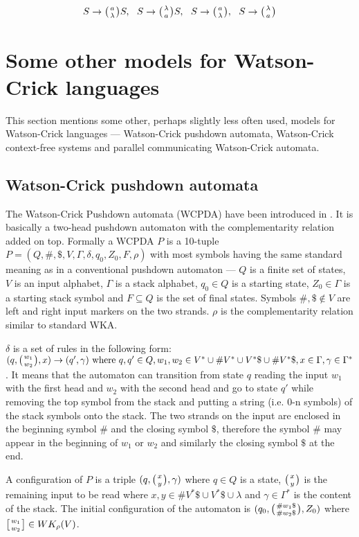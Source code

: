 $$S \rightarrow \wkpair{a}{\lambda} S, \:\:\: S \rightarrow \wkpair{\lambda}{a} S, \:\:\: S \rightarrow \wkpair{a}{\lambda}, \:\:\: S \rightarrow \wkpair{\lambda}{a}$$

\section{Some other models for Watson-Crick languages}
This section mentions some other, perhaps slightly less often used, models for Watson-Crick languages --- Watson-Crick pushdown automata, Watson-Crick context-free systems and parallel communicating Watson-Crick automata.

\subsection{Watson-Crick pushdown automata}
The Watson-Crick Pushdown automata (WCPDA) have been introduced in \cite{WK_PUSHDOWN_AUT}. It is basically a two-head pushdown automaton with the complementarity relation added on top. Formally a WCPDA $P$ is a 10-tuple $P = (Q, \#, \$, V, \Gamma, \delta, q_0, Z_0, F, \rho)$ with most symbols having the same standard meaning as in a conventional pushdown automaton --- $Q$ is a finite set of states, $V$ is an input alphabet, $\Gamma$ is a stack alphabet, $q_0 \in Q$ is a starting state, $Z_0 \in \Gamma$ is a starting stack symbol and $F \subseteq Q$ is the set of final states. Symbols $\#, \$ \notin V$ are left and right input markers on the two strands. $\rho$ is the complementarity relation similar to standard WKA.

$\delta$ is a set of rules in the following form: $(q, \wkpair{w_1}{w_2}, x) \rightarrow (q', \gamma) \textnormal{ where } q, q' \in Q, w_1, w_2 \in V^* \cup \#V^* \cup V^*\$ \cup \#V^*\$, x \in \Gamma, \gamma \in \Gamma^*$. It means that the automaton can transition from state $q$ reading the input $w_1$ with the first head and $w_2$ with the second head and go to state $q'$ while removing the top symbol from the stack and putting a string (i.e. 0-n symbols) of the stack symbols onto the stack. The two strands on the input are enclosed in the beginning symbol $\#$ and the closing symbol $\$$, therefore the symbol $\#$ may appear in the beginning of $w_1$ or $w_2$ and similarly the closing symbol $\$$ at the end.

A configuration of $P$ is a triple $(q, \wkpair{x}{y}, \gamma)$ where $q \in Q$ is a state, $\wkpair{x}{y}$ is the remaining input to be read where $x, y \in \#V^*\$ \cup V^*\$ \cup \lambda$ and $\gamma \in \Gamma^*$ is the content of the stack. The initial configuration of the automaton is $(q_0, \wkpair{\#w_1\$}{\#w_2\$}, Z_0)$ where $\wkdomain{w_1}{w_2} \in WK_{\rho}(V)$.

